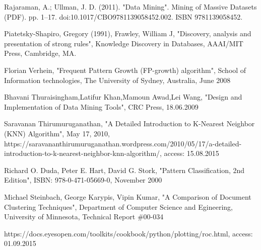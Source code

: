 \begin{thebibliography}{99}
Rajaraman, A.; Ullman, J. D. (2011). "Data Mining". Mining of Massive Datasets (PDF). pp. 1–17. doi:10.1017/CBO9781139058452.002. ISBN 9781139058452.

Piatetsky-Shapiro, Gregory (1991), Frawley, William J, "Discovery, analysis and presentation of strong rules", Knowledge Discovery in Databases, AAAI/MIT Press, Cambridge, MA.

Florian Verhein, "Frequent Pattern Growth (FP-growth) algorithm", School of Information technologies, The University of Sydney, Australia, June 2008

Bhavani Thuraisingham,Latifur Khan,Mamoun Awad,Lei Wang, "Design and Implementation of Data Mining Tools", CRC Press, 18.06.2009

Saravanan Thirumuruganathan, "A Detailed Introduction to K-Nearest Neighbor (KNN) Algorithm", May 17, 2010, https://saravananthirumuruganathan.wordpress.com/2010/05/17/a-detailed-introduction-to-k-nearest-neighbor-knn-algorithm/, access: 15.08.2015

Richard O. Duda, Peter E. Hart, David G. Stork, "Pattern Classification, 2nd Edition", ISBN: 978-0-471-05669-0, November 2000

Michael Steinbach, George Karypis, Vipin Kumar, "A Comparison of Document Clustering Techniques", Department of Computer Science and Egineering,  University of Minnesota, Technical Report \#00-034 

https://docs.eyesopen.com/toolkits/cookbook/python/plotting/roc.html, access: 01.09.2015

\end{thebibliography}